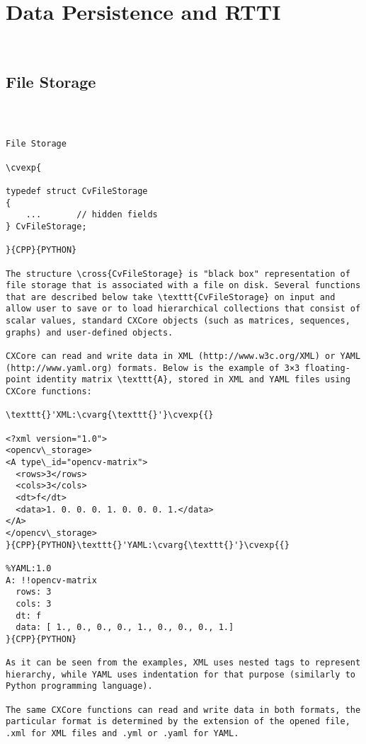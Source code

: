 \section{Data Persistence and RTTI}
\begin{verbatim}


\end{verbatim}
\subsection{File Storage}
\begin{verbatim}


\end{verbatim}
\begin{verbatim}

File Storage

\cvexp{

typedef struct CvFileStorage
{
    ...       // hidden fields
} CvFileStorage;

}{CPP}{PYTHON}

The structure \cross{CvFileStorage} is "black box" representation of file storage that is associated with a file on disk. Several functions that are described below take \texttt{CvFileStorage} on input and allow user to save or to load hierarchical collections that consist of scalar values, standard CXCore objects (such as matrices, sequences, graphs) and user-defined objects.

CXCore can read and write data in XML (http://www.w3c.org/XML) or YAML (http://www.yaml.org) formats. Below is the example of 3×3 floating-point identity matrix \texttt{A}, stored in XML and YAML files using CXCore functions:

\texttt{}'XML:\cvarg{\texttt{}'}\cvexp{{}

<?xml version="1.0">
<opencv\_storage>
<A type\_id="opencv-matrix">
  <rows>3</rows>
  <cols>3</cols>
  <dt>f</dt>
  <data>1. 0. 0. 0. 1. 0. 0. 0. 1.</data>
</A>
</opencv\_storage>
}{CPP}{PYTHON}\texttt{}'YAML:\cvarg{\texttt{}'}\cvexp{{}

%YAML:1.0
A: !!opencv-matrix
  rows: 3
  cols: 3
  dt: f
  data: [ 1., 0., 0., 0., 1., 0., 0., 0., 1.]
}{CPP}{PYTHON}

As it can be seen from the examples, XML uses nested tags to represent hierarchy, while YAML uses indentation for that purpose (similarly to Python programming language).

The same CXCore functions can read and write data in both formats, the particular format is determined by the extension of the opened file, .xml for XML files and .yml or .yaml for YAML.


\end{verbatim}
